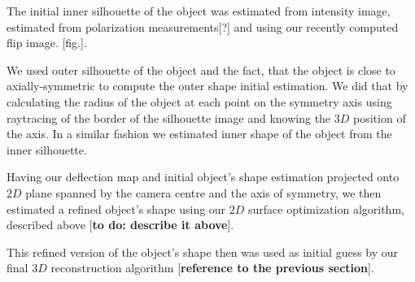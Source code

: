 \documentclass[10pt,twocolumn,letterpaper]{article}
\begin{document}
The initial inner silhouette of the object was estimated from intensity image, estimated from polarization measurements[?] and
using our recently computed flip image. [fig.].

We used outer silhouette of the object and the fact, that the object is close to axially-symmetric to compute the outer shape
initial estimation. We did that by calculating the radius of the object at each point on the symmetry axis using raytracing of the border of the silhouette image and knowing the $3D$ position of the axis. In a similar fashion we estimated inner shape of the object from the inner silhouette.

Having our deflection map and initial object's shape estimation projected onto $2D$ plane spanned by the camera centre and the
axis of symmetry, we then estimated a refined object's shape using our $2D$ surface optimization algorithm, described above [{\bf{to do: describe it above}}]. 

This refined version of the object's shape then was used as initial guess by our final $3D$ reconstruction algorithm [{\bf{reference
to the previous section}}].

\end{document}
